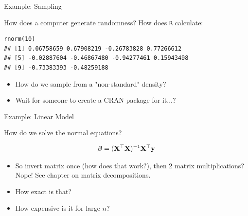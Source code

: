 \documentclass[11pt,compress,t,notes=noshow, xcolor=table]{beamer}
\begin{document}

%
%
%
%
%
\normalsize
\begin{vbframe}{Example: Sampling}

How does a computer generate randomness?
How does \texttt{R} calculate:
\lz
\footnotesize
\begin{verbatim}
rnorm(10)
## [1] 0.06758659 0.67908219 -0.26783828 0.77266612
## [5] -0.02887604 -0.46867480 -0.94277461 0.15943498
## [9] -0.73383393 -0.48259188
\end{verbatim}


\normalsize
\lz
\begin{itemize}
\item How do we sample from a "non-standard" density?
\item Wait for someone to create a CRAN package for it...?
\end{itemize}

\end{vbframe}

\begin{vbframe}{Example: Linear Model}

How do we solve the normal equations?

  $$ \bm{\beta} = (\mathbf{X}^\top \mathbf{X})^{-1} \mathbf{X}^\top \mathbf{y} $$

\begin{itemize}
\item So invert matrix once (how does that work?),
  then 2 matrix multiplications? Nope! See chapter on matrix decompositions.
\item How exact is that?
\item How expensive is it for large $n$?
\end{itemize}

\end{vbframe}
\end{document}
